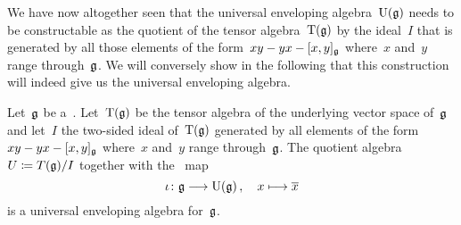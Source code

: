 \begin{fluff}
	We have now altogether seen that the universal enveloping algebra~$\operatorname{U}(\mathfrak{g})$ needs to be constructable as the quotient of the tensor algebra~$\operatorname{T}(\mathfrak{g})$ by the ideal~$I$ that is generated by all those elements of the form~$x y - y x - [x,y]_{\mathfrak{g}}$ where~$x$ and~$y$ range through~$\mathfrak{g}$.
	We will conversely show in the following  that this construction will indeed give us the universal enveloping algebra.
\end{fluff}


\begin{proposition}
	\label{existence of uea}
	Let~$\mathfrak{g}$ be a~\liealgebra{$\kf$}.
	Let~$\operatorname{T}(\mathfrak{g})$ be the tensor algebra of the underlying vector space of~$\mathfrak{g}$ and let~$I$ the two-sided ideal of~$\operatorname{T}(\mathfrak{g})$ generated by all elements of the form~$x y - y x - [x,y]_{\mathfrak{g}}$ where~$x$ and~$y$ range through~$\mathfrak{g}$.
	The quotient algebra~$U \coloneqq T(\mathfrak{g})/I$ together with the~{\linear{$\kf$}} map
	\[
		\iota
		\colon
		\glie
		\to
		\Univ(\glie) \,,
		\quad
		x
		\mapsto
		\class{x}
	\]
	is a universal enveloping algebra for~$\mathfrak{g}$.
\end{proposition}


